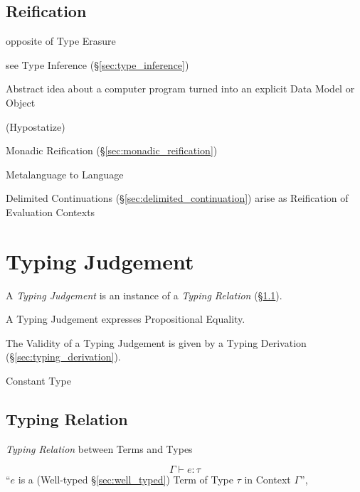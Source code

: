 \subsection{Reification}\label{sec:reification}

opposite of Type Erasure

see Type Inference (\S\ref{sec:type_inference})

Abstract idea about a computer program turned into an explicit Data
Model or Object

(Hypostatize) %

Monadic Reification (\S\ref{sec:monadic_reification})

Metalanguage to Language

Delimited Continuations (\S\ref{sec:delimited_continuation}) arise as
Reification of Evaluation Contexts



\section{Typing Judgement}\label{sec:typing_judgement}

A \emph{Typing Judgement} is an instance of a \emph{Typing Relation}
(\S\ref{sec:typing_relation}).

A Typing Judgement expresses Propositional Equality. %

The Validity of a Typing Judgement is given by a Typing Derivation
(\S\ref{sec:typing_derivation}).

Constant Type %



\subsection{Typing Relation}\label{sec:typing_relation}

\emph{Typing Relation} between Terms and Types

\[
  \Gamma \vdash e : \tau
\]
``$e$ is a (Well-typed \S\ref{sec:well_typed}) Term of Type $\tau$ in
Context $\Gamma$'',

